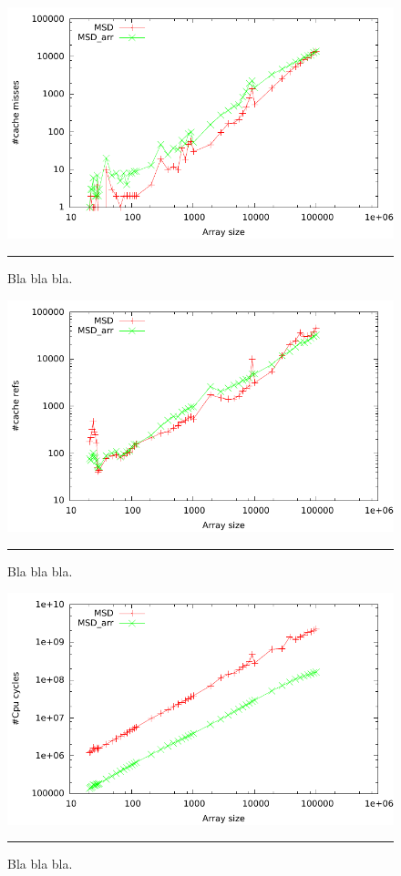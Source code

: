 \begin{figure}[htbp]
	\centering
		\includegraphics[width=\textwidth]{./Figures/Project2b/Cache_misses.pdf}
		\rule{35em}{0.5pt}
	\caption[Cache misses]{
	Bla bla bla.
	}
	\label{fig:Cache_misses}
\end{figure}



\begin{figure}[htbp]
	\centering
		\includegraphics[width=\textwidth]{./Figures/Project2b/Cache_refs.pdf}
		\rule{35em}{0.5pt}
	\caption[Cache refs]{
	Bla bla bla.
	}
	\label{fig:Cache_refs}
\end{figure}



\begin{figure}[htbp]
	\centering
		\includegraphics[width=\textwidth]{./Figures/Project2b/Cpu_cycles.pdf}
		\rule{35em}{0.5pt}
	\caption[CPU cycles]{
	Bla bla bla.
	}
	\label{fig:Cpu_cycles}
\end{figure}


